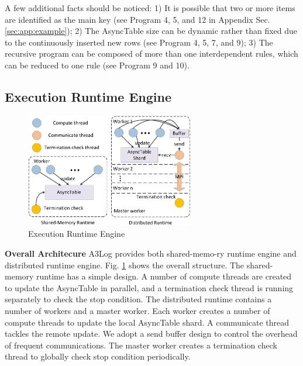 \documentclass{vldb}
\begin{document}
A few additional facts should be noticed: 1) It is possible that two or more items are identified as the main key (see Program 4, 5, and 12 in Appendix Sec. \ref{sec:app:example}); 2) The AsyncTable size can be dynamic rather than fixed due to the continuously inserted new rows (see Program 4, 5, 7, and 9); 3) The recursive program can be composed of more than one interdependent rules, which can be reduced to one rule (see Program 9 and 10).

\subsection{Execution Runtime Engine}
\label{sec:system:runtime}

\begin{figure}[!t]
    \centering
  \includegraphics[width=2.9in]{fig/runtime}
  \vspace{-0.1in}
  \caption{Execution Runtime Engine}
  \label{fig:runtime}
  \vspace{-0.1in}
\end{figure}

\noindent\textbf{Overall Architecure}
A3Log provides both shared-memo-ry runtime engine and distributed runtime engine. Fig. \ref{fig:runtime} shows the overall structure. The shared-memory runtime has a simple design. A number of compute threads are created to update the AsyncTable in parallel, and a termination check thread is running separately to check the stop condition. The distributed runtime contains a number of workers and a master worker. Each worker creates a number of compute threads to update the local AsyncTable shard. A communicate thread tackles the remote update. We adopt a send buffer design to control the overhead of frequent communications. The master worker creates a termination check thread to globally check stop condition periodically.
\end{document}
